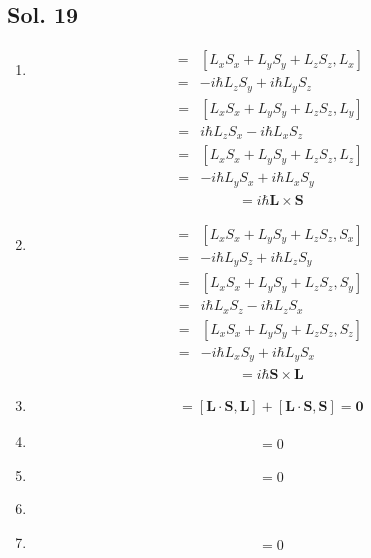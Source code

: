 \subsection*{Sol. 19}
\begin{enumerate}
    \item 
    \begin{align*}
        [\bm L\cdot \bm S, L_x]
        =&[L_xS_x + L_yS_y+L_zS_z, L_x]\\
        =&-i\hbar L_zS_y+i\hbar L_yS_z
    \end{align*}
    \begin{align*}
        [\bm L\cdot \bm S, L_y]
        =&[L_xS_x + L_yS_y+L_zS_z, L_y]\\
        =&i\hbar L_zS_x-i\hbar L_xS_z
    \end{align*}
    \begin{align*}
        [\bm L\cdot \bm S, L_z]
        =&[L_xS_x + L_yS_y+L_zS_z, L_z]\\
        =&-i\hbar L_yS_x+i\hbar L_xS_y
    \end{align*}
    \begin{align*}
        [\bm L\cdot \bm S, \bm L] = i\hbar \bm L\times \bm S
    \end{align*}
    \item 
    \begin{align*}
        [\bm L\cdot \bm S, S_x]
        =&[L_xS_x + L_yS_y+L_zS_z, S_x]\\
        =&-i\hbar L_yS_z+i\hbar L_zS_y
    \end{align*}
    \begin{align*}
        [\bm L\cdot \bm S, S_y]
        =&[L_xS_x + L_yS_y+L_zS_z, S_y]\\
        =&i\hbar L_xS_z-i\hbar L_zS_x
    \end{align*}
    \begin{align*}
        [\bm L\cdot \bm S, S_z]
        =&[L_xS_x + L_yS_y+L_zS_z, S_z]\\
        =&-i\hbar L_xS_y+i\hbar L_yS_x
    \end{align*}
    \begin{align*}
        [\bm L\cdot \bm S, \bm S] = i\hbar \bm S\times \bm L
    \end{align*}
    \item 
    \begin{align*}
        [\bm L\cdot \bm S, \bm J]
        =[\bm L\cdot \bm S, \bm L]+[\bm L\cdot \bm S, \bm S]=\bm 0
    \end{align*}
    \item 
    \begin{align*}
        [\bm L\cdot \bm S, L^2] = 0
    \end{align*}
    \item 
    \begin{align*}
        [\bm L\cdot \bm S, S^2] = 0
    \end{align*}
    \item 
    \item 
    \begin{align*}
        [\bm L\cdot \bm S, J^2] = 0
    \end{align*}
\end{enumerate}

